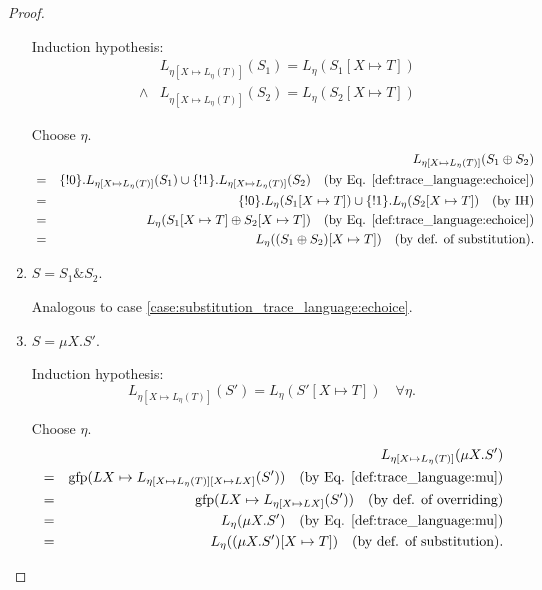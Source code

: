 \documentclass{llncs}
\newcommand*{\gfp}{\mathrm{gfp}}
\newcommand*{\union}{\cup}
\newcommand*{\send}{\mathord{!}}
\newcommand*{\echoice}{\oplus}
\newcommand*{\ichoice}{\mathop{\&}}
\renewcommand*{\|}{\;|\;}
\begin{document}
\begin{proof}
\begin{enumerate}
      Induction hypothesis:
      \begin{eqnarray*}
        &&      L_{\eta[X \mapsto L_\eta(T)]}(S_1) = L_\eta(S_1[X \mapsto T]) \\
        &\land& L_{\eta[X \mapsto L_\eta(T)]}(S_2) = L_\eta(S_2[X \mapsto T])
      \end{eqnarray*}

      Choose $\eta$.
      \begin{eqnarray*}
        &&  L_{\eta[X \mapsto L_\eta(T)]}(S_1 \echoice S_2) \\
        &=& \{\send 0\} . L_{\eta[X \mapsto L_\eta(T)]}(S_1) \union \{\send 1\} . L_{\eta[X \mapsto L_\eta(T)]}(S_2)
            \quad \text{(by Eq. \ref{def:trace_language:echoice})} \\
        &=& \{\send 0\} . L_\eta(S_1[X \mapsto T]) \union \{\send 1\} . L_\eta(S_2[X \mapsto T])
            \quad \text{(by IH)} \\
        &=& L_\eta(S_1[X \mapsto T] \echoice S_2[X \mapsto T])
            \quad \text{(by Eq. \ref{def:trace_language:echoice})} \\
        &=& L_\eta((S_1 \echoice S_2)[X \mapsto T])
            \quad \text{(by def. of substitution)}.
      \end{eqnarray*}

    \item
      \label{case:substitution_trace_language:ichoice}
      $S = S_1 \ichoice S_2$.

      Analogous to case \ref{case:substitution_trace_language:echoice}.

    \item
      \label{case:substitution_trace_language:mu1}
      $S = \mu X.S'$.

      Induction hypothesis:
      \begin{equation*}
        L_{\eta[X \mapsto L_\eta(T)]}(S') = L_\eta(S'[X \mapsto T]) \quad \forall \eta.
      \end{equation*}

      Choose $\eta$.
      \begin{eqnarray*}
        &&  L_{\eta[X \mapsto L_\eta(T)]}(\mu X.S') \\
        &=& \gfp(LX \mapsto L_{\eta[X \mapsto L_\eta(T)][X \mapsto LX]}(S'))
            \quad \text{(by Eq. \ref{def:trace_language:mu})} \\
        &=& \gfp(LX \mapsto L_{\eta[X \mapsto LX]}(S'))
            \quad \text{(by def. of overriding)} \\
        &=& L_\eta(\mu X.S')
            \quad \text{(by Eq. \ref{def:trace_language:mu})} \\
        &=& L_\eta((\mu X.S')[X \mapsto T])
            \quad \text{(by def. of substitution)}. \\
      \end{eqnarray*}


\end{enumerate}
\end{proof}
\end{document}
